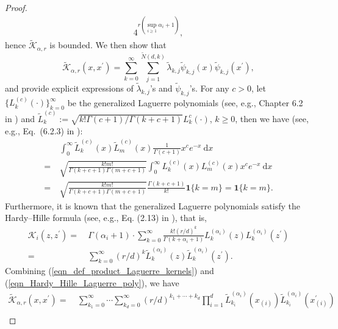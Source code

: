 \documentclass{article}
\theoremstyle{plain}
\theoremstyle{definition}
\theoremstyle{remark}
\begin{document}
\begin{appendix}
\begin{proof}
\begin{align*}
    4^{r(\sup_{i \geq 1}\alpha_i + 1)},
\end{align*}
hence $\tilde{\mathscr{K}}_{\alpha, r}$ is bounded. 
\fi
We then show that
$$
\tilde{\mathscr{K}}_{\alpha, r}(x,x^\prime) = \sum_{k=0}^{\infty} \sum_{j=1}^{\tilde{N}(d, k)} \tilde{\lambda}_{k, j}  \tilde{\psi}_{k, j}(x) \tilde{\psi}_{k, j}\left(x^\prime\right),
$$
and provide explicit expressions of $\tilde{\lambda}_{k, j}$'s and $\tilde{\psi}_{k, j}$'s. 
For any $c>0$, let $\{L_{k}^{(c)}(\cdot)\}_{k = 0}^{\infty}$ be the generalized Laguerre polynomials (see, e.g., Chapter 6.2 in \cite{andrews1999special})
and $\tilde{L}_{k}^{(c)}:=\sqrt{k! \Gamma(c+1) / \Gamma(k+c+1)}L_{k}^{c}(\cdot)$, $k \geq 0$, then we have (see, e.g., Eq.~(6.2.3) in \cite{andrews1999special}):
\begin{align*}
    &~\int_{0}^{\infty} \tilde{L}_{k}^{(c)}(x) \tilde{L}_{m}^{(c)}(x) \frac{1}{\Gamma(c+1)} x^{c}  e^{-x} ~ \mathrm{d} x\\
    =&~
    \sqrt{\frac{k! m!}{\Gamma(k+c+1)\Gamma(m+c+1)}}\int_{0}^{\infty} L_{k}^{(c)}(x) L_{m}^{(c)}(x) x^{c}  e^{-x} ~ \mathrm{d} x\\
    =&~
    \sqrt{\frac{k! m!}{\Gamma(k+c+1)\Gamma(m+c+1)}} \frac{\Gamma(k+c+1)}{k!} \mathbf{1}\{k=m\} = \mathbf{1}\{k=m\}.
\end{align*}
Furthermore, it is known that the generalized Laguerre polynomials satisfy the Hardy–Hille formula (see, e.g., Eq. (2.13) in \cite{chatterjea1966operational}), that is, 
\begin{equation}\label{eqn_Hardy_Hille_Laguerre_poly}
\begin{aligned}
    \mathscr{K}_{i}(z, z^{\prime}) =&~  \Gamma(\alpha_i+1) \cdot \sum_{k=0}^{\infty} \frac{k! (r/d)^{k}}{\Gamma(k+\alpha_i+1)} L_{k}^{(\alpha_i)}(z) L_{k}^{(\alpha_i)}(z^{\prime})\\
    =&~ \sum_{k=0}^{\infty}  (r/d)^{k} \tilde{L}_{k}^{(\alpha_i)}(z) \tilde{L}_{k}^{(\alpha_i)}(z^{\prime}).
\end{aligned}
\end{equation}
Combining (\ref{eqn_def_product_Laguerre_kernels}) and (\ref{eqn_Hardy_Hille_Laguerre_poly}), we have
\begin{equation*}
    \begin{aligned}
        \tilde{\mathscr{K}}_{\alpha, r}(x,x^\prime) =&~ \sum_{k_1=0}^{\infty} \cdots \sum_{k_d=0}^{\infty} (r/d)^{k_1 + \cdots + k_d} \prod_{i=1}^{d} \tilde{L}_{k_i}^{(\alpha_i)}(x_{(i)}) \tilde{L}_{k_i}^{(\alpha_i)}(x_{(i)}^{\prime})\\

\end{aligned}
\end{equation*}
\end{proof}
\end{appendix}
\end{document}
